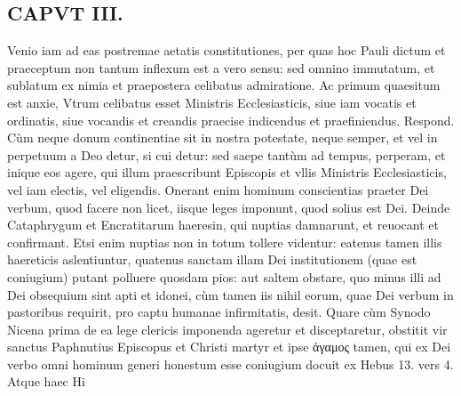 \documentclass{article}
\begin{document}
\begin{pages}
\section*{CAPVT  III. }
\marginpar{[ p.111 ]}\pstart Venio iam ad eas postremae aetatis constitutiones, per quas hoc Pauli dictum et praeceptum non tantum inflexum est a vero sensu: sed omnino immutatum, et sublatum ex nimia et praepostera celibatus admiratione.  \pend\pstart Ac primum quaesitum est anxie, Vtrum celibatus esset Ministris Ecclesiasticis, siue iam vocatis et ordinatis, siue vocandis et creandis praecise indicendus et praefiniendus. Respond. Cùm neque donum continentiae sit in nostra potestate, neque  semper, et vel in perpetuum a Deo detur, si cui detur: sed saepe tantùm ad tempus, perperam, et inique eos agere, qui illum praescribunt Episcopis et vllis Ministris Ecclesiasticis, vel iam electis, vel eligendis. Onerant enim hominum conscientias praeter Dei verbum, quod facere non licet, iisque leges imponunt, quod solius est Dei. Deinde Cataphrygum et Encratitarum haeresin, qui nuptias damnarunt, et reuocant et confirmant. Etsi enim nuptias non in totum tollere videntur: eatenus tamen illis haereticis aslentiuntur, quatenus sanctam illam Dei institutionem (quae est coniugium) putant polluere quosdam pios: aut saltem obstare, quo minus illi ad Dei obsequium sint apti et idonei, cùm tamen iis nihil eorum, quae Dei verbum in pastoribus requirit, pro captu humanae infirmitatis, desit.  \pend\pstart Quare cùm Synodo Nicena prima de ea lege clericis imponenda ageretur et disceptaretur, obstitit vir sanctus Paphnutius Episcopus et Christi martyr et ipse ἀγαμος tamen, qui ex Dei verbo omni hominum generi honestum esse coniugium docuit ex Hebus  13. vers 4. Atque haec Hi\pend

\end{pages}
\end{document}
